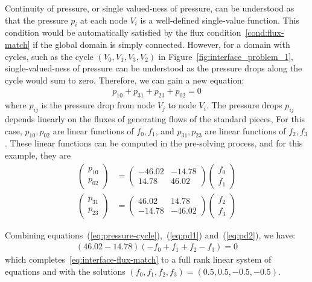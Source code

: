 \documentclass[10pt,twocolumn,letterpaper]{article}
\begin{document}
Continuity of pressure, or single valued-ness of pressure, 
can be understood as that the pressure $p_i$ at each node $V_i$ is 
a well-defined single-value function. 
This condition would be automatically satisfied by the flux condition~\ref{cond:flux-match} 
if the global domain is simply connected. 
However, for a domain with cycles, 
such as the cycle $(V_0,V_1,V_3,V_2)$ in Figure~\ref{fig:interface_problem_1}, 
single-valued-ness of pressure can be understood as 
the pressure drops along the cycle would sum to zero. Therefore, we can gain a new equation: 
\begin{align}
  p_{10} + p_{31} + p_{23} + p_{02} =0 \label{eq:pressure-cycle}
\end{align}
where $p_{ij}$ is the pressure drop from node $V_j$ to node $V_i$. 
The pressure drops $p_{ij}$ depends linearly on the fluxes of generating flows of the standard pieces, 
For this case, $p_{10}, p_{02}$ are linear functions of $f_0,f_1$, 
and $p_{31}, p_{23}$ are linear functions of $f_2,f_3$. 
These linear functions can be computed in the pre-solving process,
and for this example, they are
\begin{align}
  \begin{pmatrix} p_{10} \\ p_{02} \end{pmatrix} 
  &= \begin{pmatrix}
    -46.02 & -14.78 \\
    14.78 & 46.02
  \end{pmatrix}
  \begin{pmatrix}
    f_0\\
    f_1
  \end{pmatrix} \label{eq:pd1} \\
  \begin{pmatrix} p_{31} \\ p_{23} \end{pmatrix} 
  &= \begin{pmatrix}
    46.02 & 14.78 \\
    -14.78 & -46.02
  \end{pmatrix}
  \begin{pmatrix}
    f_2\\
    f_3
  \end{pmatrix}\label{eq:pd2}
\end{align}

Combining equations~(\ref{eq:pressure-cycle}),~(\ref{eq:pd1}) and~(\ref{eq:pd2}), we have:
\begin{align}
  (46.02-14.78)(-f_0 + f_1 + f_2 - f_3) = 0
\end{align}
which completes~\eqref{eq:interface-flux-match} to a full rank linear system of equations 
and with the solutions $(f_0,f_1,f_2,f_3) = (0.5,0.5,-0.5,-0.5)$. 
\end{document}
